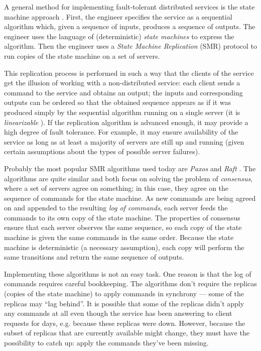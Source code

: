 \documentclass[12pt,a4paper,en]{pracamgr}
\newcommand{\ti}[1]{\textit{#1}}
\begin{document}
A general method for implementing fault-tolerant distributed services is the state machine approach \cite{timeclocks, schneidertut}. First, the engineer specifies the service as a sequential algorithm which, given a sequence of inputs, produces a sequence of outputs. The engineer uses the language of (deterministic) \ti{state machines} to express the algorithm. Then the engineer uses a \ti{State Machine Replication} (SMR) protocol to run copies of the state machine on a set of servers.

This replication process is performed in such a way that the clients of the service get the illusion of working with a non-distributed service: each client sends a command  to the service and obtains an output; the inputs and corresponding outputs can be ordered so that the obtained sequence appears as if it was produced simply by the sequential algorithm running on a single server (it is \ti{linearizable} \cite{h&w}). If the replication algorithm is advanced enough, it may provide a high degree of fault tolerance. For example, it may ensure availability of the service as long as at least a majority of servers are still up and running (given certain assumptions about the types of possible server failures).

Probably the most popular SMR algorithms used today are \ti{Paxos} \cite{parttime} and \ti{Raft} \cite{bridging}. The algorithms are quite similar \cite{paxosvsraft} and both focus on solving the problem of \ti{consensus}, where a set of servers agree on something; in this case, they agree on the sequence of commands for the state machine. As new commands are being agreed on and appended to the resulting \ti{log of commands}, each server feeds the commands to its own copy of the state machine. The properties of consensus ensure that each server observes the same sequence, so each copy of the state machine is given the same commands in the same order. Because the state machine is deterministic (a necessary assumption), each copy will perform the same transitions and return the same sequence of outputs.

Implementing these algorithms is not an easy task. One reason is that the log of commands requires careful bookkeeping. The algorithms don't require the replicas (copies of the state machine) to apply commands in synchrony --- some of the replicas may ``lag behind''. It is possible that some of the replicas didn't apply any commands at all even though the service has been answering to client requests for days, e.g. because these replicas were down. However, because the subset of replicas that are currently available might change, they must have the possibility to catch up: apply the commands they've been missing.
\end{document}
